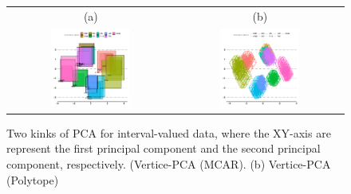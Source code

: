 \documentclass[article]{jss}
\begin{document}
\begin{appendix}
\begin{figure}[t!]
\begin{center}
\begin{tabular}{cc}
(a) & (b) \\
\includegraphics[width=0.5\textwidth]{pic/PCA_MCAR} &
\includegraphics[width=0.5\textwidth]{pic/PCA_Polytope}
\end{tabular}
\caption{\label{fig:PCA} Two kinks of PCA for interval-valued data, where the XY-axis are represent the first principal component and the second principal component, respectively.
(Vertice-PCA (MCAR). (b) Vertice-PCA (Polytope)}
\end{center}
\end{figure}




\end{appendix}
\end{document}
